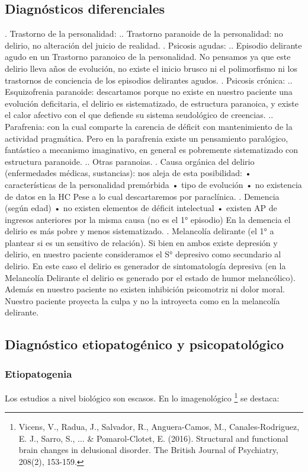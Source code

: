 \subsection*{Diagnósticos diferenciales}
. Trastorno de la personalidad:
.. Trastorno paranoide de la personalidad: no delirio, no alteración del juicio de realidad.
. Psicosis agudas:
.. Episodio delirante agudo en un Trastorno paranoico de la personalidad. No pensamos ya que este delirio lleva años de evolución, no existe el inicio brusco ni el polimorfismo ni los trastornos de conciencia de los episodios delirantes agudos.
. Psicosis crónica:
.. Esquizofrenia paranoide: descartamos porque no existe en nuestro paciente una evolución deficitaria, el delirio es sistematizado, de estructura paranoica, y existe el calor afectivo con el que defiende su sistema seudológico de creencias.
.. Parafrenia: con la cual comparte la carencia de déficit con mantenimiento de la actividad pragmática. Pero en la parafrenia existe un pensamiento paralógico, fantástico a mecanismo imaginativo, en general es pobremente sistematizado con estructura paranoide.
.. Otras paranoias.
. Causa orgánica del delirio (enfermedades médicas, sustancias): nos aleja de esta posibilidad: • características de la personalidad premórbida • tipo de evolución • no existencia de datos en la HC Pese a lo cual descartaremos por paraclínica.
. Demencia (según edad) • no existen elementos de déficit intelectual • existen AP de ingresos anteriores por la misma causa (no es el 1° episodio) En la demencia el delirio es más pobre y menos sistematizado.
. Melancolía delirante (el 1° a plantear si es un sensitivo de relación). Si bien en ambos existe depresión y delirio, en nuestro paciente consideramos el S° depresivo como secundario al delirio. En este caso el delirio es generador de sintomatología depresiva (en la Melancolía Delirante el delirio es generado por el estado de humor melancólico). Además en nuestro paciente no existen inhibición psicomotriz ni dolor moral. Nuestro paciente proyecta la culpa y no la introyecta como en la melancolía delirante.

\subsection*{Diagnóstico etiopatogénico y psicopatológico}
\subsubsection*{Etiopatogenia}
Los estudios a nivel biológico son escasos. En lo imagenológico \footnote{Vicens, V., Radua, J., Salvador, R., Anguera-Camos, M., Canales-Rodriguez, E. J., Sarro, S., ... \& Pomarol-Clotet, E. (2016). Structural and functional brain changes in delusional disorder. The British Journal of Psychiatry, 208(2), 153-159.} se destaca:


